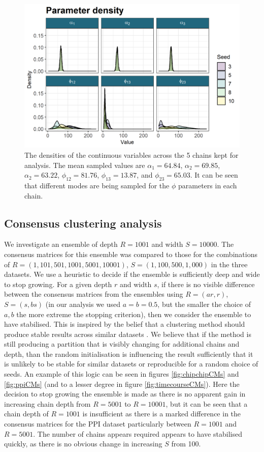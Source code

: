 \documentclass[]{article}
\begin{document}
\begin{figure}
	\centering
	\includegraphics[scale=1]{../Images/Yeast/densityPlotReduced.png}
	\caption{The densities of the continuous variables across the 5 chains kept for analysis. The mean sampled values are $\alpha_1= 64.84$, $\alpha_2 = 69.85$, $\alpha_2 = 63.22$, $\phi_{12} = 81.76$, $\phi_{13} = 13.87$, and $\phi_{23} = 65.03$. It can be seen that different modes are being sampled for the $\phi$ parameters in each chain.
	}
	\label{fig:bayesDensities}
\end{figure}

\subsection{Consensus clustering analysis}
We investigate an ensemble of depth $R=1001$ and width $S=10000$. The consensus matrices for this ensemble was compared to those for the combinations of $R = (1, 101, 501, 1001, 5001, 10001)$, $S=(1, 100, 500, 1,000)$ in the three datasets. We use a heuristic to decide if the ensemble is sufficiently deep and wide to stop growing. For a given depth $r$ and width $s$, if there is no visible difference between the consensus matrices from the ensembles using $R=(a r, r)$, $S=(s, b s)$ (in our analysis we used $a=b=0.5$, but the smaller the choice of $a,b$ the more extreme the stopping criterion), then we consider the ensemble to have stabilised. This is inspired by the belief that a clustering method should produce stable results across similar datasets \citep{von2005towards, meinshausen2010stability}. We believe that if the method is still producing a partition that is visibly changing for additional chains and depth, than the random initialisation is influencing the result sufficiently that it is unlikely to be stable for similar datasets or reproducible for a random choice of seeds. An example of this logic can be seen in figures \ref{fig:chipchipCMs} and \ref{fig:ppiCMs} (and to a lesser degree in figure \ref{fig:timecourseCMs}). Here the decision to stop growing the ensemble is made as there is no apparent gain in increasing chain depth from $R=5001$ to $R=10001$, but it can be seen that a chain depth of $R=1001$ is insufficient as there is a marked difference in the consensus matrices for the PPI dataset particularly between $R=1001$ and $R=5001$. The number of chains appears required appears to have stabilised quickly, as there is no obvious change in increasing $S$ from 100.
\end{document}
